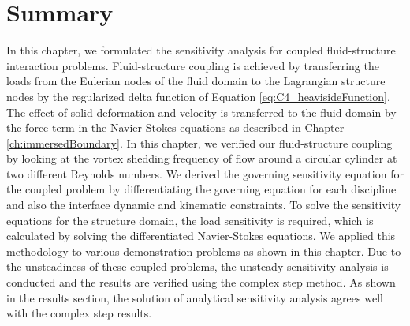 \section{Summary}
In this chapter, we formulated the sensitivity analysis for coupled fluid-structure interaction problems. Fluid-structure coupling is achieved by transferring the loads from the Eulerian nodes of the fluid domain to the Lagrangian structure nodes by the regularized delta function of Equation \eqref{eq:C4_heavisideFunction}. The effect of solid deformation and velocity is transferred to the fluid domain by the force term in the Navier-Stokes equations as described in Chapter \ref{ch:immersedBoundary}. In this chapter, we verified our fluid-structure coupling by looking at the vortex shedding frequency of flow around a circular cylinder at two different Reynolds numbers. We derived the governing sensitivity equation for the coupled problem by differentiating the governing equation for each discipline and also the interface dynamic and kinematic constraints. To solve the sensitivity equations for the structure domain, the load sensitivity is required, which is calculated by solving the differentiated Navier-Stokes equations. We applied this methodology to various demonstration problems as shown in this chapter. Due to the unsteadiness of these coupled problems, the unsteady sensitivity analysis is conducted and the results are verified using the complex step method. As shown in the results section, the solution of analytical sensitivity analysis agrees well with the complex step results.